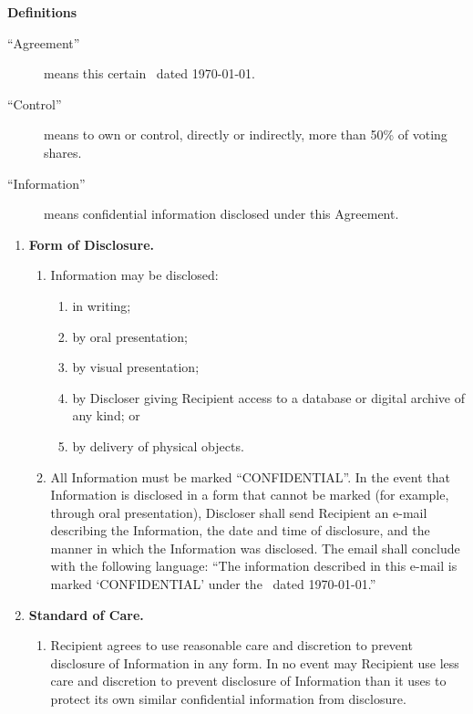 \documentclass[12pt]{article}
\begin{document}
\begin{description}\itemsep2pt
  \item {\bf Definitions}
    \begin{description}
      \item[``Agreement''] means this certain \TitleText\ dated \today.
      \item[``Control''] means to own or control, directly or indirectly, more than 50\% of voting shares.
      \item[``Information''] means confidential information disclosed under this Agreement.
    \end{description}
\end{description}
\begin{enumerate}\itemsep2pt
  \item {\bf Form of Disclosure.}
    \begin{enumerate}\itemsep2pt
      \item Information may be disclosed:
        \begin{enumerate}\itemsep2pt
           \item in writing;
           \item by oral presentation;
           \item by visual presentation;
           \item by Discloser giving Recipient access to a database or digital archive of any kind; or
           \item by delivery of physical objects.
        \end{enumerate}
      \item All Information must be marked ``CONFIDENTIAL''. In the event that Information is disclosed in a form that cannot be marked (for example, through oral presentation), Discloser shall send Recipient an e-mail describing the Information, the date and time of disclosure, and the manner in which the Information was disclosed. The email shall conclude with the following language: ``The information described in this e-mail is marked `CONFIDENTIAL' under the \TitleText\ dated \today.''
    \end{enumerate}
  \item {\bf Standard of Care.}
    \begin{enumerate}\itemsep2pt
      \item Recipient agrees to use reasonable care and discretion to prevent disclosure of Information in any form. In no event may Recipient use less care and discretion to prevent disclosure of Information than it uses to protect its own similar confidential information from disclosure.

\end{enumerate}
\end{enumerate}
\end{document}
